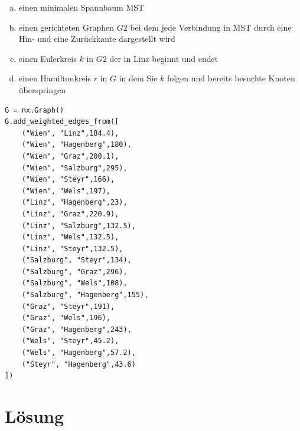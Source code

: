 \documentclass[a4paper,11pt]{report}
\begin{document}
    \begin{enumerate}[a)]
        \item einen minimalen Spannbaum MST
        \item einen gerichteten Graphen $G2$ bei dem jede Verbindung in MST durch eine Hin- und
        eine Zurückkante dargestellt wird
        \item einen Eulerkreis $k$ in $G2$ der in Linz beginnt und endet
        \item einen Hamiltonkreis $r$ in $G$ in dem Sie $k$ folgen und bereits besuchte Knoten
        überspringen
    \end{enumerate}

    \begin{verbatim}
G = nx.Graph()
G.add_weighted_edges_from([
    ("Wien", "Linz",184.4),
    ("Wien", "Hagenberg",180),
    ("Wien", "Graz",200.1),
    ("Wien", "Salzburg",295),
    ("Wien", "Steyr",166),
    ("Wien", "Wels",197),
    ("Linz", "Hagenberg",23),
    ("Linz", "Graz",220.9),
    ("Linz", "Salzburg",132.5),
    ("Linz", "Wels",132.5),
    ("Linz", "Steyr",132.5),
    ("Salzburg", "Steyr",134),
    ("Salzburg", "Graz",296),
    ("Salzburg", "Wels",108),
    ("Salzburg", "Hagenberg",155),
    ("Graz", "Steyr",191),
    ("Graz", "Wels",196),
    ("Graz", "Hagenberg",243),
    ("Wels", "Steyr",45.2),
    ("Wels", "Hagenberg",57.2),
    ("Steyr", "Hagenberg",43.6)
])
    \end{verbatim}

    \section{Lösung}
\end{document}

